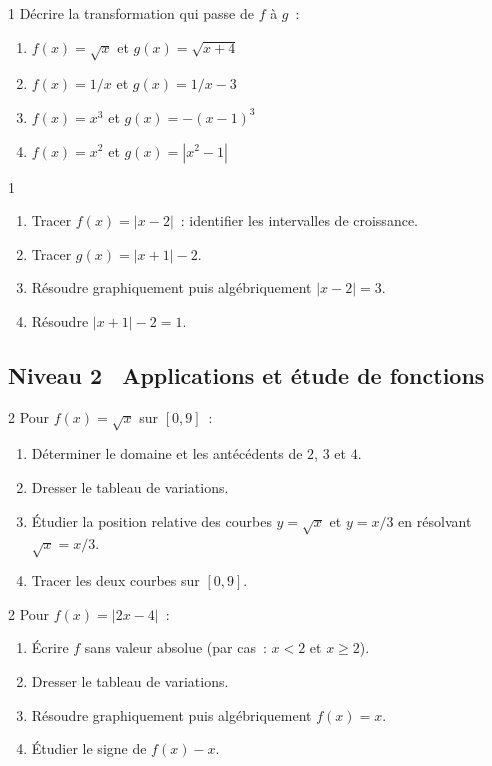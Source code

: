 \begin{exo}{1}
D\'ecrire la transformation qui passe de $f$ \`a $g$~:
\begin{enumerate}
  \item $f(x)=\sqrt{x}$ et $g(x)=\sqrt{x+4}$
  \item $f(x)=1/x$ et $g(x)=1/x-3$
  \item $f(x)=x^3$ et $g(x)=-(x-1)^3$
  \item $f(x)=x^2$ et $g(x)=|x^2-1|$
\end{enumerate}
\end{exo}

\begin{exo}{1}
\begin{enumerate}
  \item Tracer $f(x)=|x-2|$~: identifier les intervalles de croissance.
  \item Tracer $g(x)=|x+1|-2$.
  \item R\'esoudre graphiquement puis alg\'ebriquement $|x-2|=3$.
  \item R\'esoudre $|x+1|-2=1$.
\end{enumerate}
\end{exo}

\subsection*{\quad Niveau 2 \textemdash\ Applications et \'etude de fonctions}

\begin{exo}{2}
Pour $f(x)=\sqrt{x}$ sur $[0,9]$~:
\begin{enumerate}
  \item D\'eterminer le domaine et les ant\'ec\'edents de $2$, $3$ et $4$.
  \item Dresser le tableau de variations.
  \item \'Etudier la position relative des courbes $y=\sqrt{x}$ et $y=x/3$
        en r\'esolvant $\sqrt{x}=x/3$.
  \item Tracer les deux courbes sur $[0,9]$.
\end{enumerate}
\end{exo}

\begin{exo}{2}
Pour $f(x)=|2x-4|$~:
\begin{enumerate}
  \item \'Ecrire $f$ sans valeur absolue (par cas~: $x<2$ et $x\geq2$).
  \item Dresser le tableau de variations.
  \item R\'esoudre graphiquement puis alg\'ebriquement $f(x)=x$.
  \item \'Etudier le signe de $f(x)-x$.
\end{enumerate}
\end{exo}

